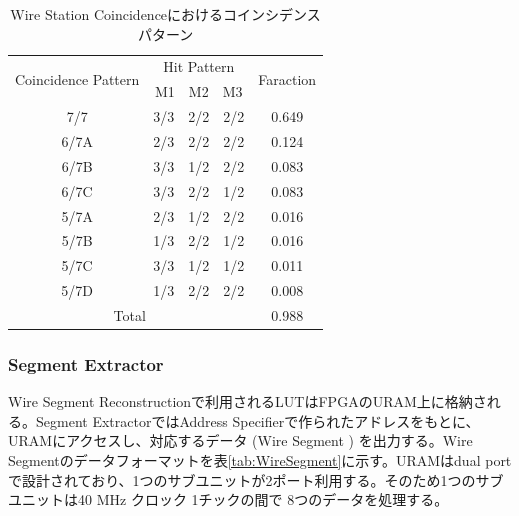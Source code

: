 \begin{table}[h]
    \centering
    \caption{Wire Station Coincidenceにおけるコインシデンスパターン}
    \label{tab:StationCoin_wire}
    \begin{tabular}{|cc|c|}
    \hline
    \multicolumn{1}{|c|}{\multirow{2}{*}{Coincidence Pattern}} & Hit Pattern & \multirow{2}{*}{Faraction} \\ \cline{2-2}
    \multicolumn{1}{|c|}{}                                     & M1　M2　M3    &                            \\ \hline\hline
    \multicolumn{1}{|c|}{7/7}                                  & 3/3　2/2　2/2 & 0.649                      \\ \hline
    \multicolumn{1}{|c|}{6/7A}                                 & 2/3　2/2　2/2 & 0.124                      \\ \hline
    \multicolumn{1}{|c|}{6/7B}                                 & 3/3　1/2　2/2 & 0.083                      \\ \hline
    \multicolumn{1}{|c|}{6/7C}                        & 3/3　2/2　1/2 & 0.083                      \\ \hline
    \multicolumn{1}{|c|}{5/7A}                                 & 2/3　1/2　2/2 & 0.016                      \\ \hline
    \multicolumn{1}{|c|}{5/7B}                                 & 1/3　2/2　1/2 & 0.016                      \\ \hline
    \multicolumn{1}{|c|}{5/7C}                                 & 3/3　1/2　1/2 & 0.011                      \\ \hline
    \multicolumn{1}{|c|}{5/7D}                                 & 1/3　2/2　2/2 & 0.008                      \\ \hline\hline
    \multicolumn{2}{|c|}{Total}                                              & 0.988                      \\ \hline
    \end{tabular}
\end{table}

\subsubsection*{Segment Extractor}
Wire Segment Reconstructionで利用されるLUTはFPGAのURAM上に格納される。Segment ExtractorではAddress Specifierで作られたアドレスをもとに、URAMにアクセスし、対応するデータ (Wire Segment ) を出力する。Wire Segmentのデータフォーマットを表\ref{tab:WireSegment}に示す。URAMはdual portで設計されており、1つのサブユニットが2ポート利用する。そのため1つのサブユニットは40 MHz クロック 1チックの間で 8つのデータを処理する。

